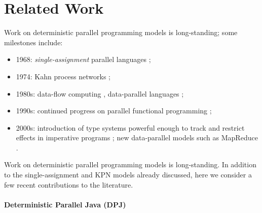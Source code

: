 \section{Related Work}
\label{section:related}

Work on deterministic parallel programming
models is long-standing; some milestones include:

\begin{itemize}
\item 1968: {\em single-assignment} parallel languages \cite{Tesler-1968};
\item 1974: Kahn process networks \cite{kahn-1974};
\item 1980s: data-flow computing \cite{IStructures}, data-parallel
              languages \cite{Sabot_Paralation};
\item 1990s: continued progress on parallel functional programming 
      \cite{ph,blelloch_something,hammond_par_90s};
\item 2000s: introduction of type systems powerful enough to track
  and restrict effects in imperative programs \cite{par_by_default};
  new data-parallel models such as MapReduce \cite{MapReduce}.
\end{itemize}
\fi{}

Work on deterministic parallel programming
models is long-standing.
In addition to the single-assignment and KPN models already
discussed, here we consider a few recent contributions to the literature.

\paragraph{Deterministic Parallel Java (DPJ)}


